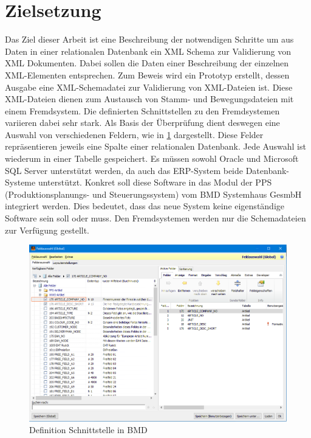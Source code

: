 \section{Zielsetzung}
Das Ziel dieser Arbeit ist eine Beschreibung der notwendigen Schritte um aus Daten in einer relationalen Datenbank ein XML Schema zur Validierung von XML Dokumenten. Dabei sollen die Daten einer Beschreibung der einzelnen XML-Elementen entsprechen. Zum Beweis wird ein Prototyp erstellt, dessen Aus\-gabe eine XML-\-Schemadatei zur Validierung von XML-\-Dateien ist. Diese XML-Dateien dienen zum Austausch von Stamm-\- und Bewegungsdateien mit einem Fremd\-system. 
Die definierten Schnittstellen zu den Fremdsystemen variieren dabei sehr stark.
Als Basis der Überprüfung dient deswegen eine Auswahl von 
verschiedenen Feldern, wie in \ref{fig:Feldauswahl} dargestellt. 
Diese Felder repräsentieren jeweils eine Spalte einer relationalen Datenbank. 
Jede Auswahl ist wiederum in einer Tabelle gespeichert. 
Es müssen sowohl Oracle und Microsoft SQL Server unterstützt werden, da auch das ERP-System beide Datenbank-Systeme unterstützt. 
Konkret soll diese Software in das Modul der PPS (Produktionsplanungs- und Steuerungssystem) vom BMD Systemhaus GesmbH integriert werden. 
Dies bedeutet, dass das neue System keine eigen\-ständige Software sein soll oder muss. 
Den Fremdsystemen werden nur die Schemadateien zur Verfügung gestellt.

\begin{figure}
    \centering
    \includegraphics[width=.95\textwidth]{images/Feldauswahl.png}
    \caption{Definition Schnittstelle in BMD}
    \label{fig:Feldauswahl}
\end{figure}
